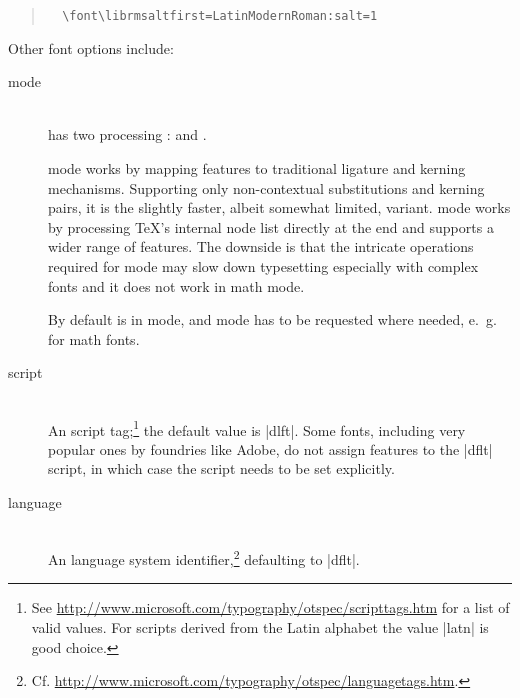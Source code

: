 \begin{quote}
  \begin{verbatim}
  \font\librmsaltfirst=LatinModernRoman:salt=1
  \end{verbatim}
\end{quote}

\noindent Other font options include:

\begin{description}

\item [mode] \hfill \\
        has two \OpenType processing
       :
        and .

        mode works by mapping \OpenType
       features to traditional \TEX ligature and kerning mechanisms.
       Supporting only non-contextual substitutions and kerning
       pairs, it is the slightly faster, albeit somewhat limited, variant.
        mode works by processing \TeX’s internal
       node list directly at the \LUA end and supports
       a wider range of \OpenType features.
       The downside is that the intricate operations required for
        mode may slow down typesetting especially
       with complex fonts and it does not work in math mode.

       By default  is in 
       mode, and  mode has to be requested where needed,
       e.~g. for math fonts.

\item [script] \label{script-tag} \hfill \\
       An \OpenType script tag;\footnote{%
         See \url{http://www.microsoft.com/typography/otspec/scripttags.htm}
         for a list of valid values.
         For scripts derived from the Latin alphabet the value
         |latn| is good choice.
       }
       the default value is |dlft|.
       Some fonts, including very popular ones by foundries like Adobe,
       do not assign features to the |dflt| script, in
       which case the script needs to be set explicitly.

\item [language] \hfill \\
       An \OpenType language system identifier,\footnote{%
         Cf. \url{http://www.microsoft.com/typography/otspec/languagetags.htm}.
       }
       defaulting to |dflt|.


\end{description}

